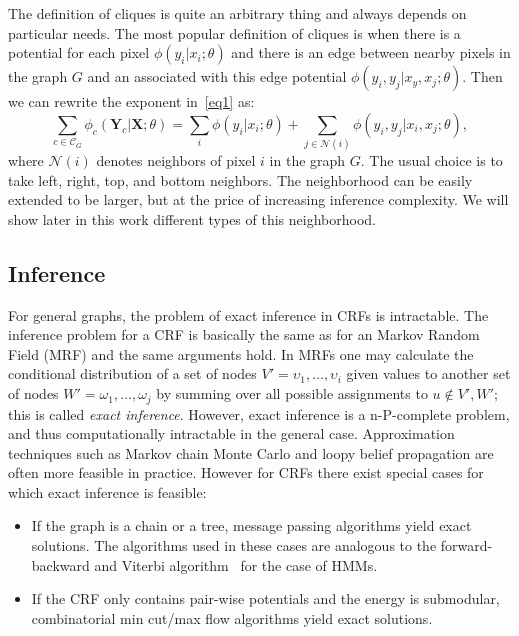 The definition of cliques is quite an arbitrary thing and always depends on particular needs. The most popular definition of cliques
is when there is a potential for each pixel $\phi(y_i | x_i; \theta)$ and there is an edge between nearby pixels in the graph $G$ and 
an associated with this edge potential $\phi(y_i, y_j | x_y, x_j; \theta)$. Then we can rewrite the exponent in~\eqref{eq1} as:
\begin{equation}
 \sum_{c \in \mathcal{C}_G} \phi_c(\mathbf{Y}_c | \mathbf{X}; \theta) = \sum_{i}\phi(y_i | x_i; \theta) + \sum_{j \in \mathcal{N}(i)}\phi(y_i, y_j | x_i, x_j; \theta),
\end{equation}
where $\mathcal{N}(i)$ denotes neighbors of pixel $i$ in the graph $G$. The usual choice is to take left, right, top, and bottom
neighbors. The neighborhood can be easily extended to be larger, but at the price of increasing inference complexity. We will
show later in this work different types of this neighborhood.

\subsection{Inference}
For general graphs, the problem of exact inference in CRFs is intractable. The inference problem for a CRF is 
basically the same as for an Markov Random Field (MRF) and the same arguments hold. In MRFs one may calculate 
the conditional distribution of a set of nodes $ V' = {\upsilon_1,\dots, \upsilon_i} $ given values to another 
set of nodes $ W' = {\omega_1,\dots, \omega_j} $ by summing over all possible assignments to $ u \notin V', W' $; 
this is called \emph{exact inference}. However, exact inference is a n-P-complete problem, and thus computationally 
intractable in the general case. Approximation techniques such as Markov chain Monte Carlo and loopy 
belief propagation are often more feasible in practice.
However for CRFs there exist special cases for which exact inference is feasible:
\begin{itemize}
 \item If the graph is a chain or a tree, message passing algorithms yield exact solutions. 
 The algorithms used in these cases are analogous to the forward-backward and Viterbi algorithm~\cite{Forney2005} for the case of HMMs.
 \item If the CRF only contains pair-wise potentials and the energy is submodular, 
 combinatorial min cut/max flow algorithms yield exact solutions.
\end{itemize}


